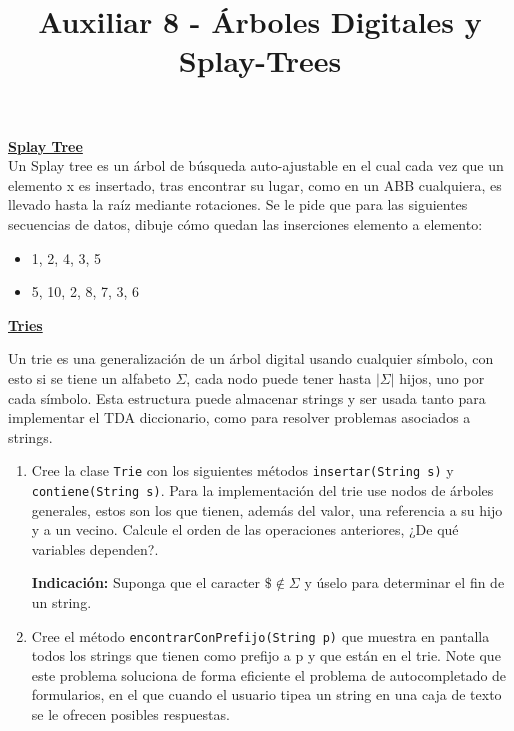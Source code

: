 \documentclass[dcc,uchile,sol]{fcfmcourse}
\title{Auxiliar 8 - Árboles Digitales y Splay-Trees}
\newcommand{\ptitle}[1]{\underline{\textbf{#1}}}
\begin{document}
\maketitle

\vspace{-1ex}


\begin{problems}

\problem \ptitle{Splay Tree}\\
Un Splay tree es un árbol de búsqueda auto-ajustable en el cual cada vez que un elemento
x es insertado, tras encontrar su lugar, como en un ABB cualquiera, es llevado hasta la raíz
mediante rotaciones. Se le pide que para las siguientes secuencias de datos, dibuje cómo
quedan las inserciones elemento a elemento:
\begin{itemize}
    \item 1, 2, 4, 3, 5
    \item 5, 10, 2, 8, 7, 3, 6
\end{itemize}

\problem \ptitle{Tries}

Un trie es una generalización de un árbol digital usando cualquier símbolo, con esto si se tiene un alfabeto $\Sigma$, cada nodo puede tener hasta $|\Sigma|$ hijos, uno por cada símbolo. Esta estructura puede almacenar strings y ser usada tanto para implementar el TDA diccionario, como para resolver problemas asociados a strings.

\begin{enumerate}
    \item Cree la clase \texttt{Trie} con los siguientes métodos \texttt{insertar(String s)} y \texttt{contiene(String s)}. Para la implementación del trie use nodos de árboles generales, estos son los que tienen, además del valor, una referencia a su hijo y a un vecino. Calcule el orden de las operaciones anteriores, ¿De qué variables dependen?.
    
    \textbf{Indicación:} Suponga que el caracter $\$ \notin \Sigma$ y úselo para determinar el fin de un string. 
    
    \item Cree el método \texttt{encontrarConPrefijo(String p)} que muestra en pantalla todos los strings que tienen como prefijo a p y que están en el trie. Note que este problema soluciona de forma eficiente el problema de autocompletado de formularios, en el que cuando el usuario tipea un string en una caja de texto se le ofrecen posibles respuestas.
\end{enumerate}




\end{problems}
\end{document}
